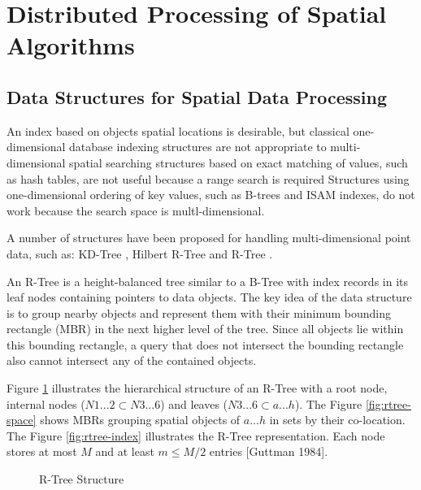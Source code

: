 \section{Distributed Processing of Spatial Algorithms}
\label{sec:spatial_dist}

\subsection{Data Structures for Spatial Data Processing}
\label{sub:spatialdata}
	An index based on objects spatial locations is desirable, but classical one-dimensional database indexing structures are not appropriate to multi-dimensional spatial searching structures based on exact matching of values, such as hash tables, are not useful because a range search is required Structures using one-dimensional ordering of key values, such as B-trees \cite{bayer1970BTree,bentley1975BTree} and ISAM indexes, do not work because the search space is multl-dimensional. 
		
	A number of structures have been proposed for handling multi-dimensional point data, such as: KD-Tree \cite{bentley1975multidimensional}, Hilbert R-Tree \cite{kamel1994hilbert} and R-Tree \cite{guttman1984r}.
	
	An R-Tree is a height-balanced tree similar to a B-Tree \cite{comer1979ubiquitous} with index records in its leaf nodes containing pointers to data objects. The key idea of the data structure is to group nearby objects and represent them with their minimum bounding rectangle (MBR) in the next higher level of the tree. Since all objects lie within this bounding rectangle, a query that does not intersect the bounding rectangle also cannot intersect any of the contained objects.

Figure \ref{fig:rtree} illustrates the hierarchical structure of an R-Tree with a root node, internal nodes ($N1...2 \subset N3...6$) and leaves ($N3...6 \subset a...h$). The Figure \ref{fig:rtree-space} shows MBRs grouping spatial objects of $a...h$ in sets by their co-location. The Figure \ref{fig:rtree-index} illustrates the R-Tree representation. Each node stores at most $M$ and at least $m \leq M/2$ entries [Guttman 1984].

\begin{figure}[h]
  \centering
   \qquad
  \caption{R-Tree Structure}
  \label{fig:rtree}
\end{figure}

